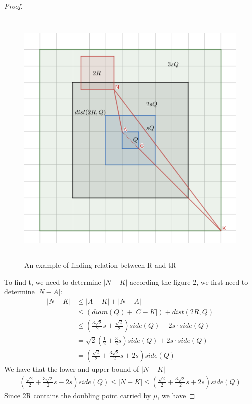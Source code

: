 \documentclass{article}
\begin{document}
\begin{proof}
\begin{figure}
    \includegraphics[width = 5in, height = 5in]{findt.png}
    \caption{An example of finding relation between R and tR}
    \label{fig:my_label}
\end{figure}
To find t, we need to determine $|N - K|$ according the figure 2, we first need to determine $|N - A|$:
\begin{equation*}
    \begin{aligned}
    |N - K| & \leq |A - K| + |N - A| \\
    & \leq (diam(Q) + |C - K|) + dist(2R,Q)\\
    & \leq (\frac{3\sqrt{2}}{2}s + \frac{\sqrt{2}}{2})side(Q) + 2s\cdot side(Q) \\
    & = \sqrt{2}(\frac{1}{2} + \frac{3}{2}s)side(Q) + 2s\cdot side(Q) \\
    & = (\frac{\sqrt{2}}{2} + \frac{3\sqrt{2}}{2}s + 2s)side(Q)
    \end{aligned}
\end{equation*}
We have that the lower and upper bound of $|N - K|$
\begin{equation*}
    \begin{aligned}
(\frac{\sqrt{2}}{2} + \frac{3\sqrt{2}}{2}s - 2s)side(Q) \leq |N - K|\leq (\frac{\sqrt{2}}{2} + \frac{3\sqrt{2}}{2}s + 2s)side(Q) \label{eq:bounds of t}
    \end{aligned}
\end{equation*}
Since 2R contains the doubling point carried by $\mu$, we have

\end{proof}
\end{document}
